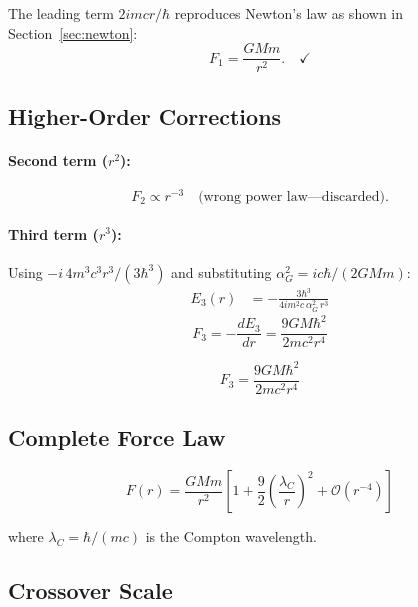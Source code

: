 \documentclass[11pt,a4paper]{article}
\theoremstyle{definition}
\theoremstyle{remark}
\begin{document}
	The leading term $2imcr/\hbar$ reproduces Newton's law as shown in Section~\ref{sec:newton}:
	\begin{equation}
		F_1 = \frac{GMm}{r^2}. \quad\checkmark
	\end{equation}
	
	\subsection{Higher-Order Corrections}
	
	\paragraph{Second term ($r^2$):}
	\begin{equation}
		F_2 \propto r^{-3} \quad\text{(wrong power law---discarded)}.
	\end{equation}
	
	\paragraph{Third term ($r^3$):}
	Using $-i\,4m^3c^3r^3/(3\hbar^3)$ and substituting $\alpha_G^2=ic\hbar/(2GMm)$:
	\begin{align}
		E_3(r) &= -\frac{3\hbar^3}{4im^2c\,\alpha_G^2\,r^3}
	\end{align}
	\begin{equation}
		F_3 = -\frac{dE_3}{dr} = \frac{9GM\hbar^2}{2mc^2r^4}
	\end{equation}
	
	\begin{equation}
		\boxed{F_3 = \frac{9GM\hbar^2}{2mc^2r^4}}
	\end{equation}
	
	\subsection{Complete Force Law}
	
	\begin{equation}
		\boxed{F(r) = \frac{GMm}{r^2}\left[1 + \frac{9}{2}\left(\frac{\lambda_C}{r}\right)^2 + \mathcal{O}(r^{-4})\right]}
	\end{equation}
	
	where $\lambda_C=\hbar/(mc)$ is the Compton wavelength.
	
	\subsection{Crossover Scale}
	
\end{document}
